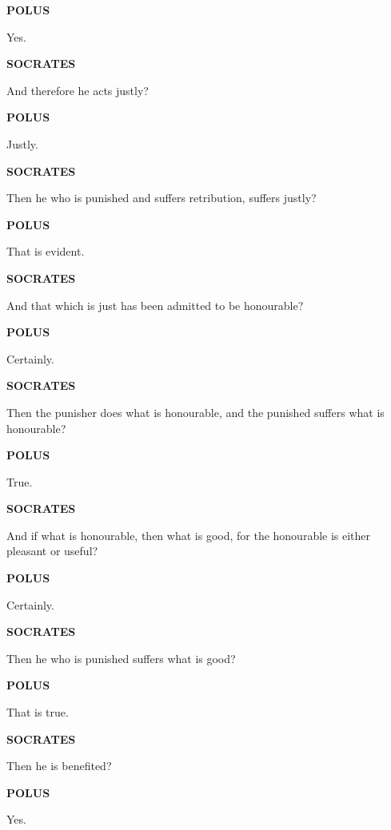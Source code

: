 \documentclass[11pt,letter]{article}
\begin{document}
\par \textbf{POLUS}
\par   Yes.

\par \textbf{SOCRATES}
\par   And therefore he acts justly?

\par \textbf{POLUS}
\par   Justly.

\par \textbf{SOCRATES}
\par   Then he who is punished and suffers retribution, suffers justly?

\par \textbf{POLUS}
\par   That is evident.

\par \textbf{SOCRATES}
\par   And that which is just has been admitted to be honourable?

\par \textbf{POLUS}
\par   Certainly.

\par \textbf{SOCRATES}
\par   Then the punisher does what is honourable, and the punished suffers what is honourable?

\par \textbf{POLUS}
\par   True.

\par \textbf{SOCRATES}
\par   And if what is honourable, then what is good, for the honourable is either pleasant or useful?

\par \textbf{POLUS}
\par   Certainly.

\par \textbf{SOCRATES}
\par   Then he who is punished suffers what is good?

\par \textbf{POLUS}
\par   That is true.

\par \textbf{SOCRATES}
\par   Then he is benefited?

\par \textbf{POLUS}
\par   Yes.
\end{document}
